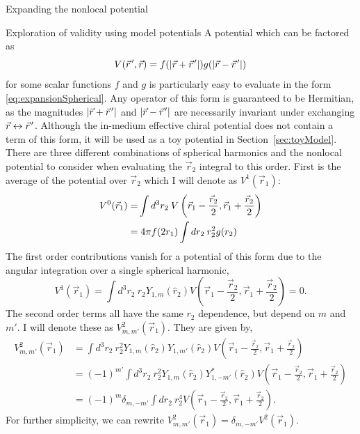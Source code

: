 \begin{section}{Expanding the nonlocal potential}
\begin{section}{Exploration of validity using model potentials \label{sec:toyModel}}
A potential which can be factored as 
\begin{equation}
V(\vec{r}\mkern2mu',\vec{r})=f(|\vec{r}+\vec{r}\mkern2mu'|)g(|\vec{r}-\vec{r}\mkern2mu'|)
\end{equation}
for some scalar functions $f$ and $g$ is particularly easy to evaluate in the form \eqref{eq:expansionSpherical}. Any operator of this form is guaranteed to be Hermitian, as the magnitudes $|\vec{r}+\vec{r}\mkern2mu'|$ and $|\vec{r}-\vec{r}\mkern2mu'|$ are necessarily invariant under exchanging $\vec{r} \leftrightarrow \vec{r}\mkern2mu'$. Although the in-medium effective chiral potential does not contain a term of this form, it will be used as a toy potential in Section~\ref{sec:toyModel}. There are three different combinations of spherical harmonics and the nonlocal potential to consider when evaluating the $\vec{r}_2$ integral to this order. First is the average of the potential over $\vec{r}_2$ which I will denote as $V^1(\vec{r}_1)$:
\begin{equation}\label{eq:V0}
\begin{split}
V^0(\vec{r}_1)=&\int d^3r_2\: V\left(\vec{r}_1-\frac{\vec{r}_2}{2},\vec{r}_1+\frac{\vec{r}_2}{2}\right) \\
=&\hspace{.1cm}4\pi f(2r_1) \int dr_2\: r_2^2 g(r_2)
\end{split}
\end{equation}
The first order contributions vanish for a potential of this form due to the angular integration over a single spherical harmonic,
\begin{equation}\label{eq:V1}
V^1(\vec{r}_1)=\int d^3r_2\:  r_2Y_{1,m}(\hat{r}_2)V\left(\vec{r}_1-\frac{\vec{r}_2}{2},\vec{r}_1+\frac{\vec{r}_2}{2}\right)=0.
\end{equation}
The second order terms all have the same $r_2$ dependence, but depend on $m$ and $m'$. I will denote these as $V^2_{m,m'}(\vec{r}_1)$. They are given by,
\begin{equation}\begin{split}
\label{eq:V2}
V^2_{m,m'}(\vec{r}_1)&=\int d^3r_2\: r_2^2Y_{1,m}(\hat{r}_2)Y_{1,m'}(\hat{r}_2)V\left(\vec{r}_1-\frac{\vec{r}_2}{2},\vec{r}_1+\frac{\vec{r}_2}{2}\right) \\
&=(-1)^{m'}\int d^3r_2\: r_2^2Y_{1,m}(\hat{r}_2)Y^*_{1,-m'}(\hat{r}_2)V\left(\vec{r}_1-\frac{\vec{r}_2}{2},\vec{r}_1+\frac{\vec{r}_2}{2}\right)\\
&=(-1)^m\delta_{m,-m'}\int d r_2 \:r_2^4 V\left(\vec{r}_1-\frac{\vec{r}_2}{2},\vec{r}_1+\frac{\vec{r}_2}{2}\right).
\end{split}
\end{equation}
For further simplicity, we can rewrite $V^2_{m,m'}(\vec{r}_1)=\delta_{m,-m'}V^2(\vec{r}_1)$.


\end{section}
\end{section}
